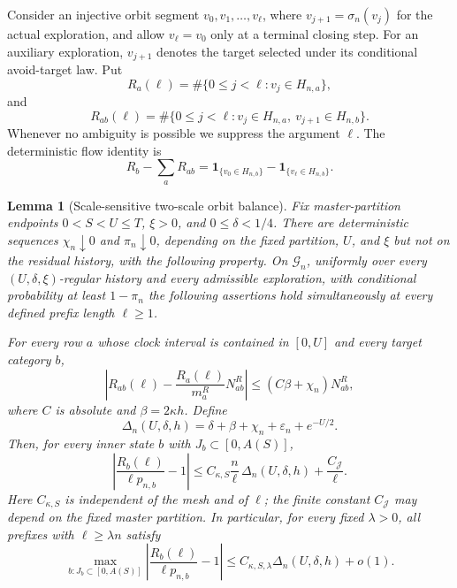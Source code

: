 \documentclass[11pt]{article}
\newtheorem{lemma}[theorem]{Lemma}
\theoremstyle{remark}
\newcommand{\one}{\mathbf 1}
\begin{document}
Consider an injective orbit segment $v_0,v_1,\ldots,v_\ell$, where
$v_{j+1}=\sigma_n(v_j)$ for the actual exploration, and allow
$v_\ell=v_0$ only at a terminal closing step.  For an auxiliary exploration,
$v_{j+1}$ denotes the target selected under its conditional avoid-target law.
Put
\[
 R_a(\ell)=\#\{0\le j<\ell:v_j\in H_{n,a}\},
\]
and
\[
 R_{ab}(\ell)=\#\{0\le j<\ell:v_j\in H_{n,a},\ v_{j+1}\in H_{n,b}\}.
\]
Whenever no ambiguity is possible we suppress the argument $\ell$.  The
deterministic flow identity is
\begin{equation}
 R_b-\sum_aR_{ab}
 =\one_{\{v_0\in H_{n,b}\}}-
  \one_{\{v_\ell\in H_{n,b}\}}.
 \label{eq:pd-flow}
\end{equation}

\begin{lemma}[Scale-sensitive two-scale orbit balance]
\label{lem:pd-two-scale-balance}
Fix master-partition endpoints $0<S<U\le T$, $\xi>0$, and
$0\le\delta<1/4$.  There are deterministic sequences
$\chi_n\downarrow0$ and $\pi_n\downarrow0$, depending on the fixed partition,
$U$, and $\xi$ but not on the residual history, with the following property.
On $\mathcal G_n$, uniformly over every $(U,\delta,\xi)$-regular history and
every admissible exploration, with conditional probability at least
$1-\pi_n$ the following assertions hold simultaneously at every defined prefix
length $\ell\ge1$.

For every row $a$ whose clock interval is contained in $[0,U]$ and every target
category $b$,
\begin{equation}
 \left|R_{ab}(\ell)-\frac{R_a(\ell)}{m_a^R}N_{ab}^R\right|
 \le (C\beta+\chi_n)N_{ab}^R,
 \label{eq:pd-row-prefix}
\end{equation}
where $C$ is absolute and $\beta=2\kappa h$.  Define
\[
        \Delta_n(U,\delta,h)
        =\delta+\beta+\chi_n+\varepsilon_n+e^{-U/2}.
\]
Then, for every inner state $b$ with $J_b\subset[0,A(S)]$,
\begin{equation}
 \left|\frac{R_b(\ell)}{\ell p_{n,b}}-1\right|
 \le C_{\kappa,S}\frac n\ell\,
        \Delta_n(U,\delta,h)
      +\frac{C_{\mathcal J}}\ell.
 \label{eq:pd-scale-sensitive-balance}
\end{equation}
Here $C_{\kappa,S}$ is independent of the mesh and of $\ell$; the finite
constant $C_{\mathcal J}$ may depend on the fixed master partition.  In
particular, for every fixed $\lambda>0$, all prefixes with $\ell\ge\lambda n$
satisfy
\[
 \max_{b:J_b\subset[0,A(S)]}
 \left|\frac{R_b(\ell)}{\ell p_{n,b}}-1\right|
 \le C_{\kappa,S,\lambda}\Delta_n(U,\delta,h)+o(1).
\]
\end{lemma}
\end{document}
